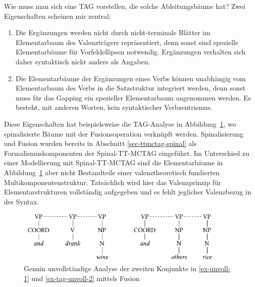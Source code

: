 Wie muss man sich eine TAG vorstellen, die solche Ableitungsbäume hat? Zwei Eigenschaften scheinen mir zentral: 
\begin{enumerate}
  \item Die Ergänzungen werden nicht durch nicht-terminale Blätter im Elementarbaum des Valenzträgers repräsentiert, denn sonst sind spezielle Elementarbäume für Vorfeldellipsen notwendig. Ergänzungen verhalten sich daher syntaktisch nicht anders als Angaben. 
  \item Die Elementarbäume der Ergänzungen eines Verbs können unabhängig vom Elementarbaum des Verbs in die Satzstruktur integriert werden, denn sonst muss für das Gapping ein spezieller Elementarbaum angenommen werden. Es besteht, mit anderen Worten, kein syntaktischer Verbzentrismus.
\end{enumerate}
Diese Eigenschaften hat beispielsweise die TAG-Analyse in Abbildung~\ref{fig-tag-unvoll-4}, wo spinalisierte Bäume mit der Fusionsoperation verknüpft werden. Spinalisierung und Fusion wurden bereits in Abschnitt \ref{sec-ttmctag-spinal} als Formalismuskomponenten der Spinal-TT-MCTAG eingeführt. Im Unterschied zu einer Modellierung mit Spinal-TT-MCTAG sind die Elementarbäume in Abbildung~\ref{fig-tag-unvoll-4} aber nicht Bestandteile einer valenztheoretisch fundierten Multikomponentenstruktur. Tatsächlich wird hier das Valenzprinzip für Elementarstrukturen vollständig aufgegeben und es fehlt jeglicher Valenzbezug in der Syntax. 

\begin{figure}[t]
\centering
\includegraphics{graphics/abb833.pdf}
\caption{\label{fig-tag-unvoll-4}Genuin unvollständige Analyse der zweiten Konjunkte in \ref{ex-unvoll-1} und \ref{ex-tag-unvoll-2} mittels Fusion}
\end{figure}

